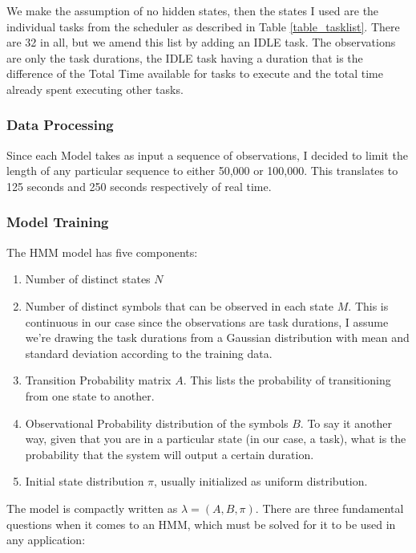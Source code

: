 We make the assumption of no hidden states, then the states I used
are the individual tasks from the scheduler as described in Table
\ref{table_tasklist}. There are 32 in all, but we amend this list by
adding an IDLE task. The observations are only the task durations, the
IDLE task having a duration that is the difference of the Total Time
available for tasks to execute and the total time already spent executing
other tasks.

\subsubsection{Data Processing}

Since each Model takes as input a
sequence of observations, I decided to limit the length of any
particular sequence to either 50,000 or 100,000. This translates to
125 seconds and 250 seconds respectively of real time.

\subsubsection{Model Training}

The HMM model has five components:

\begin{enumerate}
  \item Number of distinct states $N$
  \item Number of distinct symbols that can be observed in each state
    $M$. This is continuous in our case since the observations are
    task durations, I assume we're drawing the task durations from a
    Gaussian distribution with mean and standard deviation according
    to the training data. 
  \item Transition Probability matrix $A$. This lists the probability
    of transitioning from one state to another. 
  \item Observational Probability distribution of the symbols $B$. To
    say it another way, given that you are in a particular state (in
    our case, a task), what is the probability that the system will
    output a certain duration.
  \item Initial state distribution $\pi$, usually initialized as
    uniform distribution. 
\end{enumerate}

The model is compactly written as $\lambda = (A, B, \pi)$. There are
three fundamental questions when it comes to an HMM, which must be
solved for it to be used in any application: 

